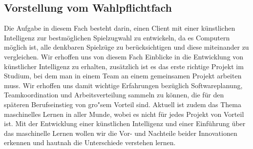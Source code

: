 \subsection{Vorstellung vom Wahlpflichtfach}\label{subsec:vorstellung-vom-wahlpflichtfach}
Die Aufgabe in diesem Fach besteht darin, einen Client mit einer k\"unstlichen Intelligenz zur bestm\"oglichen Spielzugwahl zu entwickeln, da es Computern m\"oglich ist, alle denkbaren Spielz\"uge zu ber\"ucksichtigen und diese miteinander zu vergleichen.
Wir erhoffen uns von diesem Fach Einblicke in die Entwicklung von k\"unstlicher Intelligenz zu erhalten, zus\"atzlich ist es das erste richtige Projekt im Studium, bei dem man in einem Team an einem gemeinsamen Projekt arbeiten muss.
Wir erhoffen uns damit wichtige Erfahrungen bez\"uglich Softwareplanung, Teamkoordination und Arbeitsverteilung sammeln zu k\"onnen, die f\"ur den sp\"ateren Berufseinstieg von gro"sem Vorteil sind.
Aktuell ist zudem das Thema maschinelles Lernen in aller Munde, wobei es nicht f\"ur jedes Projekt von Vorteil ist.
Mit der Entwicklung einer k\"unstlichen Intelligenz und einer Einf\"uhrung \"uber das maschinelle Lernen wollen wir die Vor- und Nachteile beider Innovationen erkennen und hautnah die Unterschiede verstehen lernen.


\bigskip
\newpage